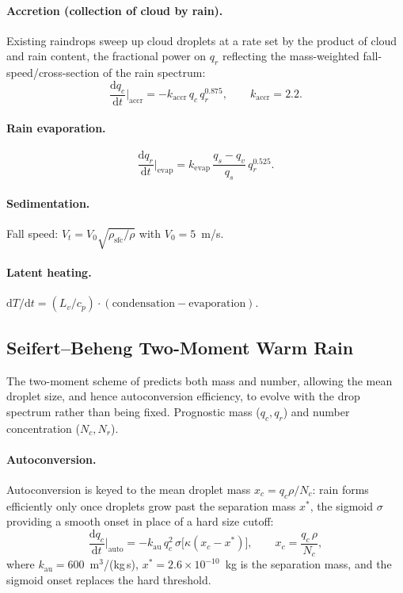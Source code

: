 \documentclass[11pt,twoside]{report}
\newcommand{\dd}{\mathrm{d}}
\newcommand{\cpd}{c_p}
\newcommand{\Lv}{L_v}
\begin{document}
\paragraph{Accretion (collection of cloud by rain).}
Existing raindrops sweep up cloud droplets at a rate set by the product of
cloud and rain content, the fractional power on $q_r$ reflecting the
mass-weighted fall-speed/cross-section of the rain spectrum:
\begin{equation}
  \frac{\dd q_c}{\dd t}\bigg|_{\mathrm{accr}}
  = -k_{\mathrm{accr}}\,q_c\,q_r^{0.875},
  \qquad k_{\mathrm{accr}}=2.2.
\end{equation}

\paragraph{Rain evaporation.}
\begin{equation}
  \frac{\dd q_r}{\dd t}\bigg|_{\mathrm{evap}}
  = k_{\mathrm{evap}}\,\frac{q_s-q_v}{q_s}\,q_r^{0.525}.
\end{equation}

\paragraph{Sedimentation.}
Fall speed: $V_t = V_0\sqrt{\rho_{\mathrm{sfc}}/\rho}$ with $V_0=5$~m/s.

\paragraph{Latent heating.}
$\dd T/\dd t = (\Lv/\cpd)\cdot(\text{condensation} - \text{evaporation})$.

\subsection{Seifert--Beheng Two-Moment Warm Rain}

The two-moment scheme of \citet{SeifertBeheng2001} predicts both mass and
number, allowing the mean droplet size, and hence autoconversion efficiency,
to evolve with the drop spectrum rather than being fixed. Prognostic mass
($q_c,q_r$) and number concentration ($N_c,N_r$).

\paragraph{Autoconversion.}
Autoconversion is keyed to the mean droplet mass $x_c=q_c\rho/N_c$: rain forms
efficiently only once droplets grow past the separation mass $x^*$, the
sigmoid $\sigma$ providing a smooth onset in place of a hard size cutoff:
\begin{equation}
  \frac{\dd q_c}{\dd t}\bigg|_{\mathrm{auto}}
  = -k_{\mathrm{au}}\,q_c^2\,
  \sigma\!\bigl[\kappa(x_c - x^*)\bigr],
  \qquad x_c = \frac{q_c\,\rho}{N_c},
\end{equation}
where $k_{\mathrm{au}}=600$~m$^3$/(kg\,s), $x^*=2.6\times 10^{-10}$~kg
is the separation mass, and the sigmoid onset replaces the hard threshold.
\end{document}
